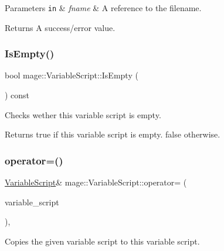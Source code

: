 \begin{DoxyParams}[1]{Parameters}
\mbox{\tt in}  & {\em fname} & A reference to the filename. \\
\hline
\end{DoxyParams}
\begin{DoxyReturn}{Returns}
A success/error value. 
\end{DoxyReturn}
\hypertarget{classmage_1_1_variable_script_a8ae619cdc5519a753780360abab87430}{}\label{classmage_1_1_variable_script_a8ae619cdc5519a753780360abab87430} 
\subsubsection{\texorpdfstring{Is\+Empty()}{IsEmpty()}}
{\footnotesize\ttfamily bool mage\+::\+Variable\+Script\+::\+Is\+Empty (\begin{DoxyParamCaption}{ }\end{DoxyParamCaption}) const}

Checks wether this variable script is empty.

\begin{DoxyReturn}{Returns}
{\ttfamily true} if this variable script is empty. {\ttfamily false} otherwise. 
\end{DoxyReturn}
\hypertarget{classmage_1_1_variable_script_ae090b066ea939fc6611e77a47df6a97f}{}\label{classmage_1_1_variable_script_ae090b066ea939fc6611e77a47df6a97f} 
\subsubsection{\texorpdfstring{operator=()}{operator=()}}
{\footnotesize\ttfamily \hyperlink{classmage_1_1_variable_script}{Variable\+Script}\& mage\+::\+Variable\+Script\+::operator= (\begin{DoxyParamCaption}\item[{const \hyperlink{classmage_1_1_variable_script}{Variable\+Script} \&}]{variable\+\_\+script }\end{DoxyParamCaption})\hspace{0.3cm}{\ttfamily [private]}, {\ttfamily [delete]}}

Copies the given variable script to this variable script.


